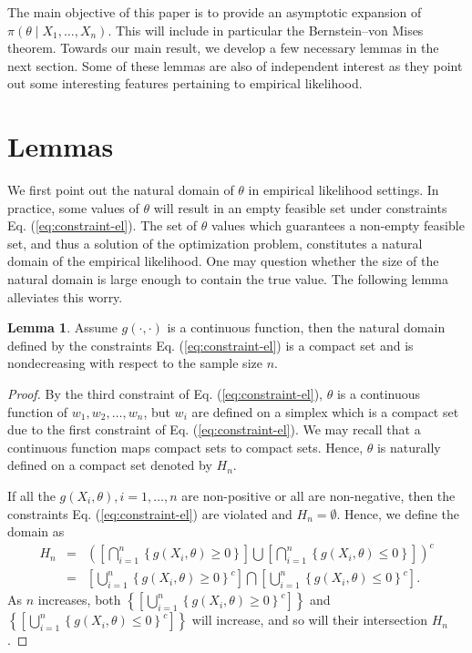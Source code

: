 \documentclass[oneside,english]{amsbook}
\numberwithin{section}{chapter}
\numberwithin{equation}{section}
\numberwithin{figure}{section}
\theoremstyle{plain}
\theoremstyle{plain}
\theoremstyle{definition}
\theoremstyle{plain}
\theoremstyle{plain}
\theoremstyle{remark}
\theoremstyle{definition}
\newtheorem{lemma}{Lemma}
\theoremstyle{definition}
\begin{document}
The main objective of this paper is to provide an asymptotic expansion
of $\pi\left(\theta\mid X_{1},\ldots,X_{n}\right)$. This will include
in particular the Bernstein--von Mises theorem. Towards our main result, we
develop a few necessary lemmas in the next section. Some of these lemmas are also of independent interest as they point out some interesting features pertaining to empirical likelihood. 


\section{Lemmas}

We first point out the natural domain of $\theta$ in empirical likelihood settings. In practice, some values of $\theta$ will result in an empty feasible set under constraints Eq. (\ref{eq:constraint-el}). The set of $\theta$ values which guarantees a non-empty feasible set, and thus a solution of the optimization problem, constitutes a natural domain of the empirical likelihood. One may question whether the size of the natural domain is large enough to contain the true value. The following lemma alleviates this worry.
\begin{lemma}
Assume $g(\cdot,\cdot)$ is a continuous function, then the natural domain defined by the constraints Eq. (\ref{eq:constraint-el}) is a compact set and is nondecreasing with respect to the sample size $n$. 
\end{lemma}
\begin{proof}
By
the third constraint of Eq. (\ref{eq:constraint-el}), $\theta$ is a
continuous function of $w_{1},w_{2},\ldots,w_{n}$, but $w_{i}$ are
defined on a simplex which is a compact set due to the first constraint  of Eq. (\ref{eq:constraint-el}). We may recall that a continuous function
maps compact sets to compact sets. Hence, $\theta$ is naturally defined
on a compact set denoted by $H_n$. 

If all the $g(X_i,\theta),i=1,\ldots,n$ are non-positive or all are non-negative, then the constraints Eq. (\ref{eq:constraint-el}) are violated and $H_n=\emptyset$. Hence, we define the domain as
\begin{eqnarray*}
	H_n&=&\left( \left[\bigcap_{i=1}^n\left\{g\left(X_i,\theta\right)\ge 0\right\}\right]\bigcup  \left[\bigcap_{i=1}^n\left\{g\left(X_i,\theta\right)\le 0\right\}\right] \right)^c\\
	&=& \left[\bigcup_{i=1}^n\left\{g\left(X_i,\theta\right)\ge 0\right\}^c\right]\bigcap  \left[\bigcup_{i=1}^n\left\{g\left(X_i,\theta\right)\le 0\right\}^c\right].
\end{eqnarray*}
As $n$ increases, both $\left\{\left[\bigcup_{i=1}^n\left\{g\left(X_i,\theta\right)\ge 0\right\}^c\right]\right\} $ and 
$\left\{\left[\bigcup_{i=1}^n\left\{g\left(X_i,\theta\right)\le 0\right\}^c\right]\right\} $ will increase, and  so will their intersection $H_n$.
\end{proof}
\end{document}
